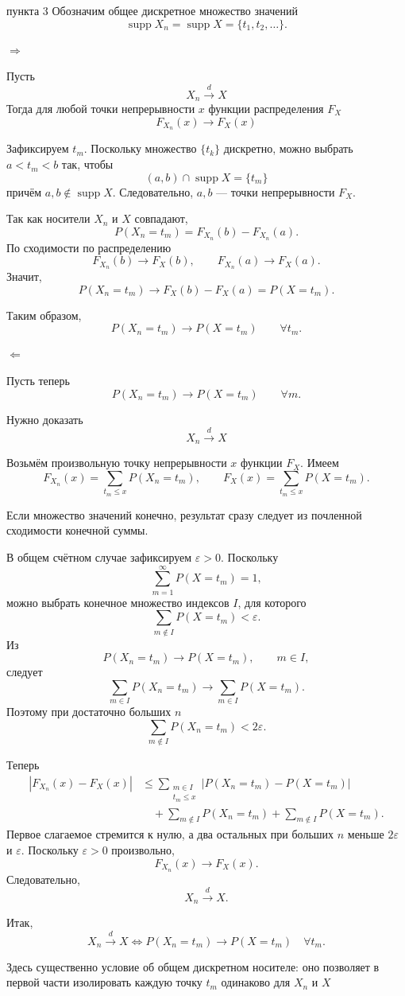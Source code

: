\documentclass[12pt,a4paper]{article}
\begin{document}
\begin{proofbox}{пункта 3}
Обозначим общее дискретное множество значений
\[
\operatorname{supp}X_n=\operatorname{supp}X=\{t_1,t_2,\ldots\}.
\]

\(\Rightarrow\)

Пусть
\[
X_n\xrightarrow{d}X
\]
Тогда для любой точки непрерывности \(x\) функции распределения \(F_X\)
\[
F_{X_n}(x)\to F_X(x)
\]

Зафиксируем \(t_m\). Поскольку множество \(\{t_k\}\) дискретно, можно выбрать \(a<t_m<b\) так, чтобы
\[
(a,b)\cap\operatorname{supp}X=\{t_m\}
\]
причём \(a,b\notin\operatorname{supp}X\). Следовательно, \(a,b\) — точки непрерывности \(F_X\).

Так как носители \(X_n\) и \(X\) совпадают,
\[
P(X_n=t_m)=F_{X_n}(b)-F_{X_n}(a).
\]
По сходимости по распределению
\[
F_{X_n}(b)\to F_X(b),\qquad
F_{X_n}(a)\to F_X(a).
\]
Значит,
\[
P(X_n=t_m)
\to F_X(b)-F_X(a)
=P(X=t_m).
\]

Таким образом,
\[
P(X_n=t_m)\to P(X=t_m)
\qquad\forall t_m.
\]

\(\Leftarrow\)

Пусть теперь
\[
P(X_n=t_m)\to P(X=t_m)
\qquad\forall m.
\]

Нужно доказать
\[
X_n\xrightarrow{d}X
\]

Возьмём произвольную точку непрерывности \(x\) функции \(F_X\). Имеем
\[
F_{X_n}(x)
=
\sum_{t_m\le x}P(X_n=t_m),
\qquad
F_X(x)
=
\sum_{t_m\le x}P(X=t_m).
\]

Если множество значений конечно, результат сразу следует из почленной сходимости конечной суммы.

В общем счётном случае зафиксируем \(\varepsilon>0\). Поскольку
\[
\sum_{m=1}^{\infty}P(X=t_m)=1,
\]
можно выбрать конечное множество индексов \(I\), для которого
\[
\sum_{m\notin I}P(X=t_m)<\varepsilon.
\]
Из
\[
P(X_n=t_m)\to P(X=t_m),\qquad m\in I,
\]
следует
\[
\sum_{m\in I}P(X_n=t_m)
\to
\sum_{m\in I}P(X=t_m).
\]
Поэтому при достаточно больших \(n\)
\[
\sum_{m\notin I}P(X_n=t_m)<2\varepsilon.
\]

Теперь
\[
\begin{aligned}
|F_{X_n}(x)-F_X(x)|
&\le
\sum_{\substack{m\in I\\t_m\le x}}
|P(X_n=t_m)-P(X=t_m)|
\\
&\quad+
\sum_{m\notin I}P(X_n=t_m)
+
\sum_{m\notin I}P(X=t_m).
\end{aligned}
\]
Первое слагаемое стремится к нулю, а два остальных при больших \(n\) меньше \(2\varepsilon\) и \(\varepsilon\). Поскольку \(\varepsilon>0\) произвольно,
\[
F_{X_n}(x)\to F_X(x).
\]
Следовательно,
\[
X_n\xrightarrow{d}X.
\]

Итак,
\[
X_n\xrightarrow{d}X
\Longleftrightarrow
P(X_n=t_m)\to P(X=t_m)
\quad\forall t_m.
\]

Здесь существенно условие об общем дискретном носителе: оно позволяет в первой части изолировать каждую точку \(t_m\) одинаково для \(X_n\) и \(X\)
\end{proofbox}
\end{document}
